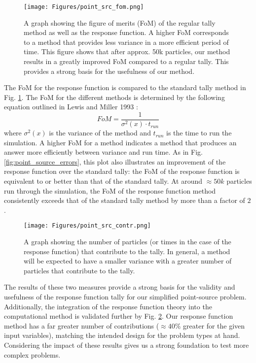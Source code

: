 \begin{chapabstract}
\begin{figure} [h!]
	\centering
	\texttt{[image: Figures/point\_src\_fom.png]}
	\caption{A graph showing the figure of merits (FoM) of the regular tally method as well as the response function. A higher FoM corresponds to a method that provides less variance in a more efficient period of time. This figure shows that after approx. 50k particles, our method results in a greatly improved FoM compared to a regular tally. This provides a strong basis for the usefulness of our method.}
	\label{fig:point_source_FoM}
\end{figure}

The FoM for the response function is compared to the standard tally method in Fig. \ref{fig:point_source_FoM}. The FoM for the different methods is determined by the following equation outlined in Lewis and Miller 1993 \cite{LM93}:
\begin{equation}
FoM = \frac{1}{\sigma^{2}(x) \cdot t_{run}}
\end{equation}
where $\sigma^{2}(x)$ is the variance of the method and $t_{run}$ is the time to run the simulation. A higher FoM for a method indicates a method that produces an answer more efficiently between variance and run time. As in Fig. \ref{fig:point_source_errors}, this plot also illustrates an improvement of the response function over the standard tally: the FoM of the response function is equivalent to or better than that of the standard tally. At around $\approx 50k$ particles run through the simulation, the FoM of the response function method consistently exceeds that of the standard tally method by more than a factor of $2$.

\begin{figure} [h!]
	\centering
	\texttt{[image: Figures/point\_src\_contr.png]}
	\caption{A graph showing the number of particles (or times in the case of the response function) that contribute to the tally. In general, a method will be expected to have a smaller variance with a greater number of particles that contribute to the tally. }
	\label{fig:point_src_num_contr}
\end{figure}

The results of these two measures provide a strong basis for the validity and usefulness of the response function tally for our simplified point-source problem. Additionally, the integration of the response function theory into the computational method is validated further by Fig. \ref{fig:point_src_num_contr}. Our response function method has a far greater number of contributions ($\approx 40 \%$ greater for the given input variables), matching the intended design for the problem types at hand. Considering the impact of these results gives us a strong foundation to test more complex problems.


\end{chapabstract}
